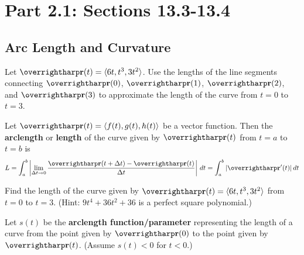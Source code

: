 \documentclass[letterpaper, twoside, 12pt]{book}
\begin{document}
\setcounter{chapter}{1}

\chapter{Part 2.1: Sections 13.3-13.4}

\setcounter{chapter}{13}
\setcounter{section}{2}

\section{Arc Length and Curvature}

          \begin{problem}
            Let $\vect{r}(t)=\<6t, t^3, 3t^2\>$. Use the lengths of
            the line segments
            connecting $\vect{r}(0)$, $\vect{r}(1)$, $\vect{r}(2)$,
            and $\vect{r}(3)$ to approximate the length of the curve
            from $t=0$ to $t=3$.
          \end{problem}

          \begin{solution}

          \end{solution}

\begin{definition}
Let $\harpvec{r}(t) = \<f(t),g(t),h(t)\>$ be a vector function.
Then the \textbf{arclength} or \textbf{length} of the curve given by
$\harpvec{r}(t)$ from $t=a$ to $t=b$ is
\[
  L
    =
  \int_a^b
  \left|
    \lim_{\Delta{t}\to0}
    \frac{\vect{r}(t+\Delta{t})-\vect{r}(t)}{\Delta{t}}
  \right|
  \dvar{t}
  =
  \int_a^b |\vect{r}'(t)| \dvar{t}
\]
\end{definition}

          \begin{problem}
            Find the length of the curve given by
            $\vect{r}(t)=\<6t, t^3, 3t^2\>$
            from $t=0$ to $t=3$.
            (Hint: $9t^4+36t^2+36$ is a perfect square polynomial.)
          \end{problem}

          \begin{solution}

          \end{solution}

\begin{definition}
Let $s(t)$ be the \textbf{arclength function/parameter} representing the
length of a curve from the point given by
$\harpvec{r}(0)$ to the point given by $\harpvec{r}(t)$.
(Assume $s(t)<0$ for $t<0$.)
\end{definition}
\end{document}
